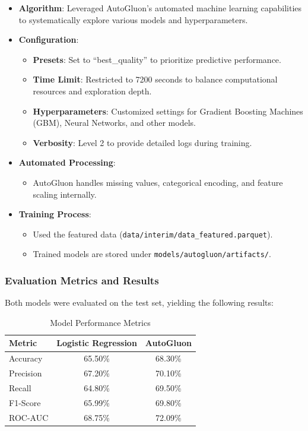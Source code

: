 \documentclass{article}
\begin{document}
\begin{itemize}[leftmargin=*]
    \item \textbf{Algorithm}: Leveraged AutoGluon's automated machine learning capabilities to systematically explore various models and hyperparameters.
    \item \textbf{Configuration}:
        \begin{itemize}[leftmargin=*]
            \item \textbf{Presets}: Set to ``best\_quality'' to prioritize predictive performance.
            \item \textbf{Time Limit}: Restricted to 7200 seconds to balance computational resources and exploration depth.
            \item \textbf{Hyperparameters}: Customized settings for Gradient Boosting Machines (GBM), Neural Networks, and other models.
            \item \textbf{Verbosity}: Level 2 to provide detailed logs during training.
        \end{itemize}
    \item \textbf{Automated Processing}:
        \begin{itemize}[leftmargin=*]
            \item AutoGluon handles missing values, categorical encoding, and feature scaling internally.
        \end{itemize}
    \item \textbf{Training Process}:
        \begin{itemize}[leftmargin=*]
            \item Used the featured data (\texttt{data/interim/data\_featured.parquet}).
            \item Trained models are stored under \texttt{models/autogluon/artifacts/}.
        \end{itemize}
\end{itemize}

\subsubsection{Evaluation Metrics and Results}

Both models were evaluated on the test set, yielding the following results:

\begin{table}[H]
\centering
\caption{Model Performance Metrics}\label{tab:model_performance}
\begin{tabular}{lcc}
\toprule
\textbf{Metric} & \textbf{Logistic Regression} & \textbf{AutoGluon} \\
\midrule
Accuracy & 65.50\% & 68.30\% \\
Precision & 67.20\% & 70.10\% \\
Recall & 64.80\% & 69.50\% \\
F1-Score & 65.99\% & 69.80\% \\
ROC-AUC & 68.75\% & 72.09\% \\
\bottomrule
\end{tabular}
\end{table}
\end{document}
